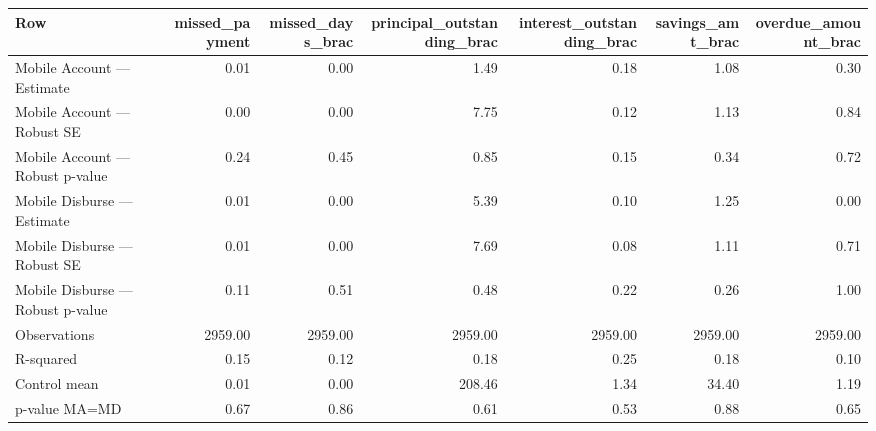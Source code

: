
\begin{tabular}{lrrrrrr}
\toprule
Row & missed\_payment & missed\_days\_brac & principal\_outstanding\_brac & interest\_outstanding\_brac & savings\_amt\_brac & overdue\_amount\_brac\\
\midrule
Mobile Account — Estimate & 0.01 & 0.00 & 1.49 & 0.18 & 1.08 & 0.30\\
Mobile Account — Robust SE & 0.00 & 0.00 & 7.75 & 0.12 & 1.13 & 0.84\\
Mobile Account — Robust p-value & 0.24 & 0.45 & 0.85 & 0.15 & 0.34 & 0.72\\
Mobile Disburse — Estimate & 0.01 & 0.00 & 5.39 & 0.10 & 1.25 & 0.00\\
Mobile Disburse — Robust SE & 0.01 & 0.00 & 7.69 & 0.08 & 1.11 & 0.71\\
\addlinespace
Mobile Disburse — Robust p-value & 0.11 & 0.51 & 0.48 & 0.22 & 0.26 & 1.00\\
Observations & 2959.00 & 2959.00 & 2959.00 & 2959.00 & 2959.00 & 2959.00\\
R-squared & 0.15 & 0.12 & 0.18 & 0.25 & 0.18 & 0.10\\
Control mean & 0.01 & 0.00 & 208.46 & 1.34 & 34.40 & 1.19\\
p-value MA=MD & 0.67 & 0.86 & 0.61 & 0.53 & 0.88 & 0.65\\
\bottomrule
\end{tabular}
